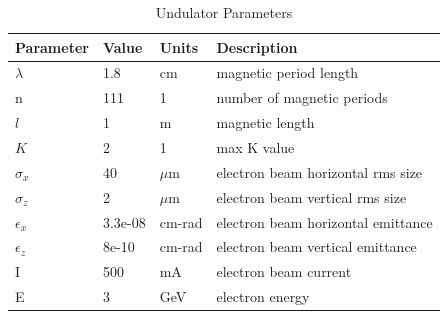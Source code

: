 \documentclass[preprint]{iucr}              %
\begin{document}
\begin{table}\label{ivubiomax}
\caption{Undulator Parameters}
\begin{tabular}{@{}llll@{}}
\toprule
Parameter       & Value         & Units     & Description                           \\
\hline
$\lambda$       & 1.8           & cm        & magnetic period length                \\
n               & 111           & 1         & number of magnetic periods            \\ 
$l$             & 1             & m         & magnetic length                       \\
$K$             & 2             & 1         & max K value                           \\
$\sigma_x$      & 40            & $\mu$m    & electron beam horizontal rms size     \\
$\sigma_z$      & 2             & $\mu$m    & electron beam vertical rms size       \\
$\epsilon_x$    & 3.3e-08       & cm-rad    & electron beam horizontal emittance    \\
$\epsilon_z$    & 8e-10         & cm-rad    & electron beam vertical emittance      \\
I               & 500           & mA        & electron beam current                 \\
E               & 3             & GeV       & electron energy                       \\
\end{tabular}
\end{table}
\end{document}
